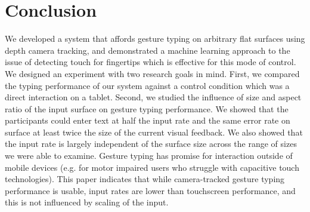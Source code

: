 \documentclass{chi-ext}
\begin{document}
\section{Conclusion}
We developed a system that affords gesture typing on arbitrary flat surfaces using depth camera tracking, and demonstrated a machine learning approach to the issue of detecting touch for fingertips which is effective for this mode of control. We designed an experiment with two research goals in mind. First, we compared the typing performance of our system against a control condition which was a direct interaction on a tablet. Second, we studied the influence of size and aspect ratio of the input surface on gesture typing performance. We showed that the participants could enter text at half the input rate and the same error rate on surface at least twice the size of the current visual feedback. We also showed that the input rate is largely independent of the surface size across the range of sizes we were able to examine. Gesture typing has promise for interaction outside of mobile devices (e.g. for motor impaired users who struggle with capacitive touch technologies). This paper indicates that while camera-tracked gesture typing performance is usable, input rates are lower than touchscreen performance, and this is not influenced by scaling of the input.




\balance


\end{document}
